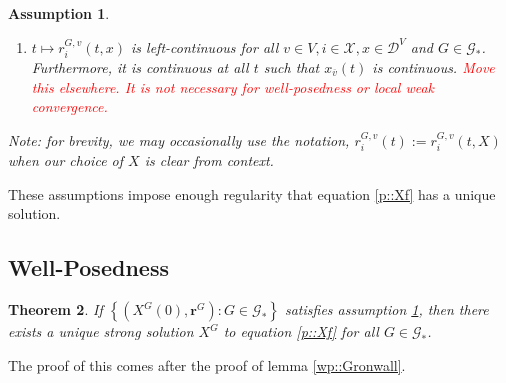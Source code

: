 \documentclass[12pt]{article}
\newcommand{\skipLine}{\vspace{12pt}}
\newcommand{\mc}{\mathcal}
\newcommand{\ov}{\overline}
\newcommand{\tr}{\textcolor{red}}
\newcommand{\defeq}{:=}								%
\newcommand{\cad}{\mc{D}}							%
\newcommand{\sta}{\mc{X}}							%
\newcommand{\cl}[1]{\ov{#1}}						%
\newcommand{\Xf}{X}									%
\newcommand{\rate}{r}								%
\newcommand{\xf}{x}									%
\newcommand{\vind}[1]{_{#1}}						%
\newcommand{\tme}[1]{(#1)}							%
\newcommand{\gind}[1]{^{#1}}						%
\newcommand{\vpara}[1]{^{#1}}						%
\newcommand{\stpara}[1]{_{#1}}						%
\newcommand{\gvpara}[2]{^{#1,#2}}					%
\newcommand{\rateset}{\mathbf{\rate}}				%
\newcommand{\tmepro}[2]{(#1,#2)}					%
\newcommand{\Gs}{\mc{G}_\ast}						%
\newtheorem{thms}{Theorem}[section]
\newtheorem{assu}[thms]{Assumption}
\begin{document}
\begin{assu}
\begin{enumerate}
\item \(t\mapsto \rate\gvpara{G}{v}\stpara{i}\tmepro{t}{\xf}\) is left-continuous for all \(v \in V,i\in \sta,\xf\in \cad\vpara{V}\) and \(G \in \Gs\). Furthermore, it is continuous at all \(t\) such that \(\xf\vind{\cl{v}}\tme{t}\) is continuous. \tr{Move this elsewhere. It is not necessary for well-posedness or local weak convergence.}
\end{enumerate}
\skipLine

Note: for brevity, we may occasionally use the notation, \(\rate\gvpara{G}{v}\stpara{i}\tme{t}\defeq \rate\gvpara{G}{v}\stpara{i}\tmepro{t}{\Xf}\) when our choice of \(\Xf\) is clear from context.
\label{a::pbasics}
\end{assu}

These assumptions impose enough regularity that equation \eqref{p::Xf} has a unique solution.

\subsection{Well-Posedness}
\label{awl::wp}

\begin{thms}
If \(\left\{(\Xf\gind{G}\tme{0},\rateset\gind{G}):G \in \Gs\right\}\) satisfies assumption \ref{a::pbasics}, then there exists a unique strong solution \(\Xf\gind{G}\) to equation \eqref{p::Xf} for all \(G \in \Gs\).
\label{wp::wp}
\end{thms}

The proof of this comes after the proof of lemma \ref{wp::Gronwall}.
\end{document}
